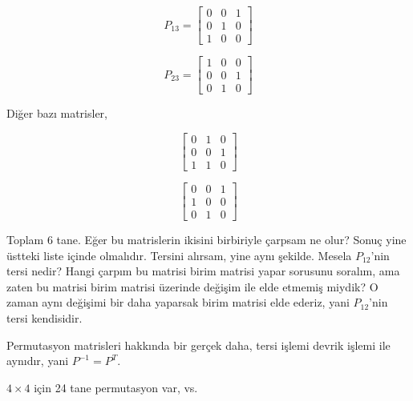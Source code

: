 \documentclass[12pt,fleqn]{article}\usepackage{../../common}
\begin{document}
$$ P_{13} = 
\left[\begin{array}{rrr}
0 & 0 & 1\\
0 & 1 & 0 \\
1  & 0 & 0
\end{array}\right]
 $$

$$ P_{23} = 
\left[\begin{array}{rrr}
1 & 0 & 0\\
0 & 0 & 1 \\
0  & 1 & 0
\end{array}\right]
 $$

Diğer bazı matrisler, 

$$  
\left[\begin{array}{rrr}
0 & 1 & 0\\
0 & 0 & 1 \\
1  & 1 & 0
\end{array}\right]
 $$

$$     
\left[\begin{array}{rrr}
0 & 0 & 1\\
1 & 0 & 0 \\
0  & 1 & 0
\end{array}\right]
 $$             
 
Toplam 6 tane. Eğer bu matrislerin ikisini birbiriyle çarpsam ne olur?
Sonuç yine üstteki liste içinde olmalıdır. Tersini alırsam, yine aynı
şekilde. Mesela $P_{12}$'nin tersi nedir? Hangi çarpım bu matrisi birim
matrisi yapar sorusunu soralım, ama zaten bu matrisi birim matrisi üzerinde
değişim ile elde etmemiş miydik? O zaman aynı değişimi bir daha yaparsak
birim matrisi elde ederiz, yani $P_{12}$'nin tersi kendisidir. 

Permutasyon matrisleri hakkında bir gerçek daha, tersi işlemi devrik işlemi
ile aynıdır, yani $P^{-1} = P^{T}$. 

$4 \times 4$ için 24 tane permutasyon var, vs.
\end{document}
